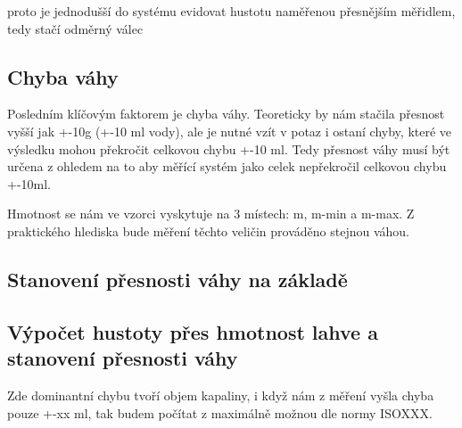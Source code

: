 proto je jednodušší do systému evidovat hustotu naměřenou přesnějším měřidlem, tedy stačí odměrný válec




\subsection{Chyba váhy}
Posledním klíčovým faktorem je chyba váhy. Teoreticky by nám stačila přesnost vyšší jak +-10g (+-10 ml vody), ale je nutné vzít v potaz i ostaní chyby, které ve výsledku mohou překročit celkovou chybu +-10 ml. Tedy přesnost váhy musí být určena z ohledem na to aby měřící systém jako celek nepřekročil celkovou chybu +-10ml.

Hmotnost se nám ve vzorci vyskytuje na 3 místech: m, m-min a m-max. Z praktického hlediska bude měření těchto veličin prováděno stejnou váhou.

\subsection{Stanovení přesnosti váhy na základě }
\subsection{Výpočet hustoty přes hmotnost lahve a stanovení přesnosti váhy}

Zde dominantní chybu tvoří objem kapaliny, i když nám z měření vyšla chyba pouze +-xx ml, tak budem počítat z maximálně možnou dle normy ISOXXX. 

